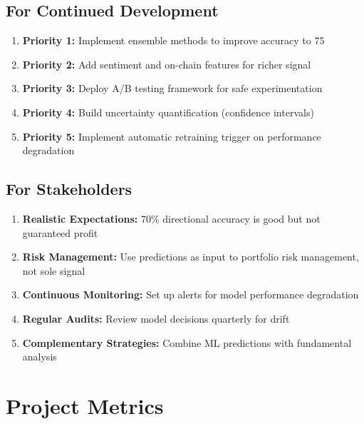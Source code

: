 \subsection{For Continued Development}

\begin{enumerate}
    \item \textbf{Priority 1:} Implement ensemble methods to improve accuracy to 75%
    \item \textbf{Priority 2:} Add sentiment and on-chain features for richer signal
    \item \textbf{Priority 3:} Deploy A/B testing framework for safe experimentation
    \item \textbf{Priority 4:} Build uncertainty quantification (confidence intervals)
    \item \textbf{Priority 5:} Implement automatic retraining trigger on performance degradation
\end{enumerate}

\subsection{For Stakeholders}

\begin{enumerate}
    \item \textbf{Realistic Expectations:} 70\% directional accuracy is good but not guaranteed profit
    \item \textbf{Risk Management:} Use predictions as input to portfolio risk management, not sole signal
    \item \textbf{Continuous Monitoring:} Set up alerts for model performance degradation
    \item \textbf{Regular Audits:} Review model decisions quarterly for drift
    \item \textbf{Complementary Strategies:} Combine ML predictions with fundamental analysis
\end{enumerate}

\section{Project Metrics}

